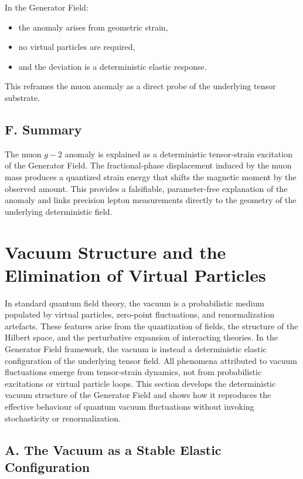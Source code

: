 \documentclass[reprint,amsmath,amssymb,aps,prl,floatfix]{revtex4-2}
\begin{document}
In the Generator Field:
\begin{itemize}
\item the anomaly arises from geometric strain,  
\item no virtual particles are required,  
\item and the deviation is a deterministic elastic response.
\end{itemize}

This reframes the muon anomaly as a direct probe of the underlying tensor substrate.

\subsection{F. Summary}

The muon \(g-2\) anomaly is explained as a deterministic tensor‑strain excitation of the Generator Field. The fractional‑phase displacement induced by the muon mass produces a quantized strain energy that shifts the magnetic moment by the observed amount. This provides a falsifiable, parameter‑free explanation of the anomaly and links precision lepton measurements directly to the geometry of the underlying deterministic field.

\section{Vacuum Structure and the Elimination of Virtual Particles}

In standard quantum field theory, the vacuum is a probabilistic medium populated by virtual particles, zero‑point fluctuations, and renormalization artefacts. These features arise from the quantization of fields, the structure of the Hilbert space, and the perturbative expansion of interacting theories. In the Generator Field framework, the vacuum is instead a deterministic elastic configuration of the underlying tensor field. All phenomena attributed to vacuum fluctuations emerge from tensor‑strain dynamics, not from probabilistic excitations or virtual particle loops.
\medskip
This section develops the deterministic vacuum structure of the Generator Field and shows how it reproduces the effective behaviour of quantum vacuum fluctuations without invoking stochasticity or renormalization.

\subsection{A. The Vacuum as a Stable Elastic Configuration}
\end{document}
